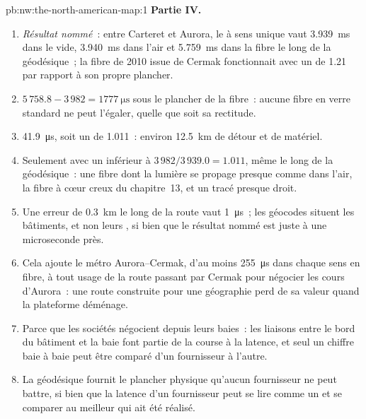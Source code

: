 \begin{solution}{pb:nw:the-north-american-map:1}
\textbf{Partie IV.}
\begin{enumerate}[resume]
\item \emph{Résultat nommé}~: entre Carteret et Aurora, le  à sens unique vaut \qty{3.939}{\milli\second} dans le vide,
\qty{3.940}{\milli\second} dans l'air et \qty{5.759}{\milli\second} dans la fibre le long de la géodésique~; la fibre de 2010 issue de Cermak fonctionnait avec un  de
1.21 par rapport à son propre plancher.
\item $5\,758.8 - 3\,982 = \qty{1777}{\micro\second}$ sous le plancher de la fibre~: aucune fibre en verre standard ne peut l'égaler, quelle que soit sa rectitude.
\item \qty{41.9}{\micro\second}, soit un  de 1.011~: environ \qty{12.5}{\kilo\metre} de détour et de matériel.
\item Seulement avec un  inférieur à $3\,982/3\,939.0 = 1.011$, même le long de la géodésique~: une fibre dont la lumière se propage presque comme dans l'air, la
fibre à cœur creux du chapitre~13, et un tracé presque droit.
\item Une erreur de \qty{0.3}{\kilo\metre} le long de la route vaut \qty{1}{\micro\second}~; les géocodes situent les bâtiments, et non leurs , si bien que le résultat nommé est juste à une microseconde près.
\item Cela ajoute le métro Aurora--Cermak, d'au moins \qty{255}{\micro\second} dans chaque sens en fibre, à tout usage de la route passant par Cermak pour négocier
les cours d'Aurora~: une route construite pour une géographie perd de sa valeur quand la plateforme déménage.
\item Parce que les sociétés négocient depuis leurs baies~: les liaisons entre le bord du bâtiment et la baie font partie de la course à la latence, et seul un chiffre
baie à baie peut être comparé d'un fournisseur à l'autre.
\item La géodésique fournit le plancher physique qu'aucun fournisseur ne peut battre, si bien que la latence d'un fournisseur peut se lire comme un  et se comparer au
meilleur qui ait été réalisé.
\end{enumerate}
\end{solution}

